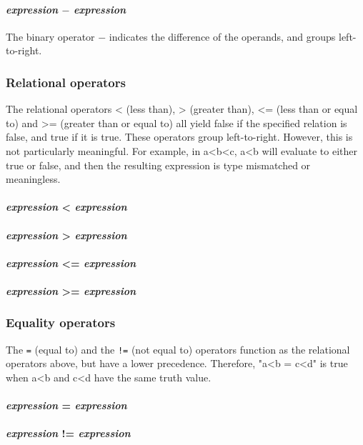 \paragraph{\textit{expression} $-$ \textit{expression}}
The binary  operator $-$ indicates the difference of the operands, and groups left-to-right.
\\
\subsubsection{Relational operators}
The  relational operators < (less than), > (greater than), <= (less than or equal to) and >= (greater than or equal to) all yield false if the specified relation is false, and true if it is true. These operators group left-to-right. However, this is not particularly meaningful. For example, in a<b<c, a<b will evaluate to either true or false, and then the resulting expression is type mismatched or meaningless.

\paragraph{\textit{expression} < \textit{expression}}
\paragraph{\textit{expression} > \textit{expression}}
\paragraph{\textit{expression} <= \textit{expression}}
\paragraph{\textit{expression} >= \textit{expression}}


\subsubsection{Equality operators}
The \texttt{=} (equal to) and the \texttt{!=} (not equal to) operators function as the relational operators above, but have a lower precedence. Therefore, "a<b = c<d" is true when a<b and c<d have the same truth value.
\\
\paragraph{\textit{expression} = \textit{expression}}
\paragraph{\textit{expression} != \textit{expression}}

